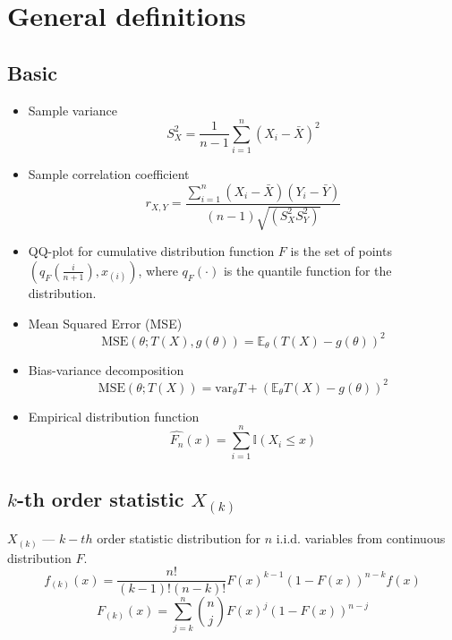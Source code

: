 \documentclass[12pt]{article}
\theoremstyle{definition}
\theoremstyle{remark}
\numberwithin{equation}{section}
\newcommand{\II}{\mathbb{I}}
\begin{document}
\section{General definitions}

\subsection{Basic}

\begin{itemize}
\item
Sample variance
\begin{equation}\label{sample_variance}
S_X^2 = \frac 1{n-1}\sum_{i = 1}^n(X_i - \bar X)^2
\end{equation}

\item
Sample correlation coefficient
\begin{equation}
r_{X,Y} = \frac{\sum_{i = 1}^{n}(X_i-\bar{X})(Y_i-\bar{Y})}{(n-1)\sqrt{(S_X^2S_Y^2)}}
\end{equation}

\item
QQ-plot for cumulative distribution function $F$ is the set of points $\left(q_F\left(\frac i {n+1}\right), x_{(i)}\right)$, where $q_F(\cdot)$ is the quantile function for the distribution.

\item Mean Squared Error (MSE)
\begin{equation}
	\text{MSE}(\theta; T(X), g(\theta)) = \mathbb{E}_\theta\left(T(X) - g(\theta)\right)^2
\end{equation}

\item
Bias-variance decomposition
\begin{equation}
\text{MSE}(\theta; T(X)) = \text{var}_\theta T + \left(\mathbb{E}_\theta T(X) - g(\theta)\right)^2
\end{equation}

\item\label{ecdf}
Empirical distribution function
\begin{equation}
	\hat{F_n}(x) = \sum_{i = 1}^n \II(X_i \leq x)
\end{equation}

\end{itemize}

\subsection {$k$-th order statistic $X_{(k)}$}
$X_{(k)}$ --- $k-th$ order statistic distribution for $n$ i.i.d. variables from continuous distribution $F$.
\begin{equation}\label{kth_order_pdf}
	f_{(k)}(x) = \frac{n!}{(k-1)!(n-k)!}F(x)^{k-1}(1-F(x))^{n-k}f(x)
\end{equation}
\begin{equation}\label{kth_order_cdf}
	F_{(k)}(x) = \sum_{j = k}^n {{n}\choose{j}}F(x)^j (1-F(x))^{n-j}
\end{equation}
\end{document}
